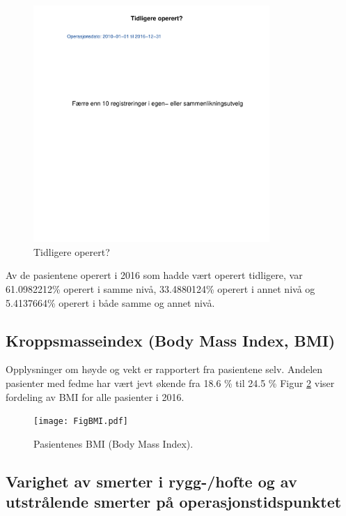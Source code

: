 \documentclass [norsk,a4paper,twoside]{article}\usepackage[]{graphicx}\usepackage[]{color}
\begin{document}
\begin{figure}[ht]
	\centering \includegraphics[width= 0.8\textwidth]{TidlOp.pdf}
	\caption{\label{fig:TidlOp} Tidligere operert? }
\end{figure}



Av de pasientene operert i 2016 som hadde vært operert tidligere, var 61.0982212\% 
operert i samme nivå, 33.4880124\% 
operert i annet nivå og 5.4137664\% 
operert i både samme og annet nivå. 


\subsection{Kroppsmasseindex (Body Mass Index, BMI)}



Opplysninger om høyde og vekt er rapportert fra pasientene selv.
Andelen pasienter med fedme har vært jevt økende fra 18.6 \%
til 24.5 \%
Figur \ref{fig:BMI} viser fordeling av BMI for alle pasienter i 2016. 

\begin{figure}[ht]
	\centering \texttt{[image: FigBMI.pdf]}
	\caption{\label{fig:BMI} Pasientenes BMI (Body Mass Index).}
\end{figure}



\clearpage


\subsection{Varighet av smerter i rygg-/hofte og av utstrålende smerter på operasjonstidspunktet}
\end{document}

